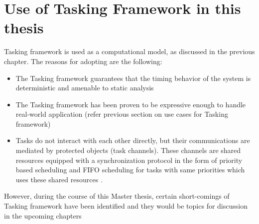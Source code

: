 \section{Use of Tasking Framework in this thesis}
Tasking framework is used as a computational model, as discussed in the previous chapter. The reasons for adopting are the following:

\begin{itemize}
\item The Tasking framework guarantees that the timing behavior of the system is deterministic and amenable to static analysis
\item The Tasking framework has been proven to be expressive enough to handle real-world application (refer previous section on use cases for Tasking framework)
\item Tasks do not interact with each other directly, but their communications are mediated by protected objects (task channels). These channels are shared resources equipped with a synchronization protocol in the form of priority based scheduling and FIFO scheduling for tasks with same priorities which uses these shared resources \cite{TaskFr}.  
\end{itemize}  

However, during the course of this Master thesis, certain short-comings of Tasking framework have been identified and they would be topics for discussion in the upcoming chapters

             



          